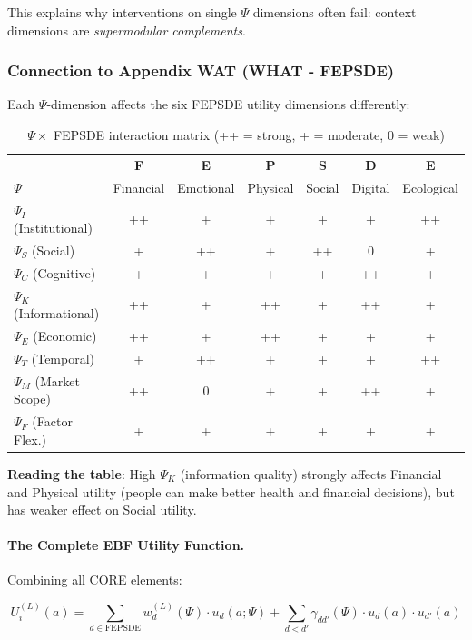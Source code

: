 This explains why interventions on single $\Psi$ dimensions often fail: 
context dimensions are \textit{supermodular complements}.

\subsubsection{Connection to Appendix WAT (WHAT - FEPSDE)}

Each $\Psi$-dimension affects the six FEPSDE utility dimensions differently:

\begin{table}[h]
\centering
\small
\begin{tabular}{l|cccccc}
\toprule
& \textbf{F} & \textbf{E} & \textbf{P} & \textbf{S} & \textbf{D} & \textbf{E} \\
$\Psi$ & Financial & Emotional & Physical & Social & Digital & Ecological \\
\midrule
$\Psi_I$ (Institutional) & ++ & + & + & + & + & ++ \\
$\Psi_S$ (Social) & + & ++ & + & ++ & 0 & + \\
$\Psi_C$ (Cognitive) & + & + & + & + & ++ & + \\
$\Psi_K$ (Informational) & ++ & + & ++ & + & ++ & + \\
$\Psi_E$ (Economic) & ++ & + & ++ & + & + & + \\
$\Psi_T$ (Temporal) & + & ++ & + & + & + & ++ \\
$\Psi_M$ (Market Scope) & ++ & 0 & + & + & ++ & + \\
$\Psi_F$ (Factor Flex.) & + & + & + & + & + & + \\
\bottomrule
\end{tabular}
\caption{$\Psi \times$ FEPSDE interaction matrix (++ = strong, + = moderate, 0 = weak)}
\label{tab:psi-fepsde}
\end{table}

\textbf{Reading the table}: High $\Psi_K$ (information quality) strongly affects 
Financial and Physical utility (people can make better health and financial 
decisions), but has weaker effect on Social utility.

\paragraph{The Complete EBF Utility Function.}

Combining all CORE elements:

\begin{equation}
U_i^{(L)}(a) = \sum_{d \in \text{FEPSDE}} w_d^{(L)}(\Psi) \cdot u_d(a; \Psi) + 
\sum_{d < d'} \gamma_{dd'}(\Psi) \cdot u_d(a) \cdot u_{d'}(a)
\label{eq:complete-utility}
\end{equation}

